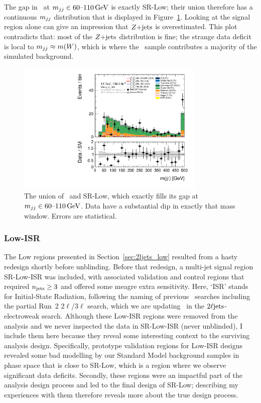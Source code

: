 The gap in \crz\ at $\mjj \in 60\textrm{--}110\,\eV[G]$ is exactly SR-Low;
their union therefore has a continuous $\mjj$ distribution that is displayed
in Figure~\ref{fig:2ljets_low_sr_or_cr_region}.
Looking at the signal region alone can give an impression that $\zjets$ is
overestimated.
This plot contradicts that: most of the $\zjets$ distribution is fine;
the strange data deficit is local to $\mjj \approx m(W)$, which is where the
\diboson\ sample contributes a majority of the simulated background.

\begin{figure}[tp]
\centering
\includegraphics[width=0.8\textwidth]{figures/2ljets_low_mjj_SRLow_or_CRZ.pdf}
\caption[
The union of CR-Z and SR-Low
]{%
The union of \crz\ and SR-Low, which exactly fills its gap at
$\mjj \in 60\textrm{--}110\,\eV[G]$.
Data have a substantial dip in exactly that mass window.
Errors are statistical.
}
\label{fig:2ljets_low_sr_or_cr_region}
\end{figure}


\subsubsection{Low-ISR}
\label{sec:2ljets_low_isr}
The Low regions presented in Section~\ref{sec:2ljets_low} resulted from a
hasty redesign shortly before unblinding.
Before that redesign, a multi-jet signal region SR-Low-ISR was included,
with associated validation and control regions
that required $\njet \geq 3$ and offered some meagre extra sensitivity.
Here, `ISR' stands for Initial-State Radiation, following the naming
of previous \atlas\ searches including the partial Run~2 $2\ell$/$3\ell$
search, which we are updating~\cite{atlas_23l_SUSY_2016_24} in the
$\twoljets$-electroweak search.
Although these Low-ISR regions were removed from the analysis and we never
inspected the data in SR-Low-ISR (never unblinded), I include them here because
they reveal some interesting context to the surviving analysis design.
Specifically, prototype validation regions for Low-ISR designs revealed some
bad modelling by our Standard Model background samples in phase space that is
close to SR-Low, which is a region where we observe significant data deficits.
Secondly, these regions were an impactful part of the analysis design process
and led to the final design of SR-Low;
describing my experiences with them therefore reveals more about the true
design process.

